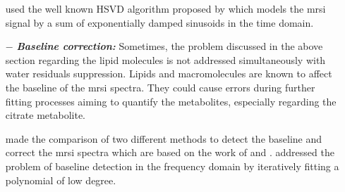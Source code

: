 \begin{enumerate}[leftmargin=*]
	\cite{Kelm2007} used the well known HSVD algorithm proposed by \cite{Pijnappel1992} which models the \ac{mrsi} signal by a sum of exponentially damped sinusoids in the time domain.%
%
%
	
\item[$-$] \textbf{\textit{Baseline correction:}} Sometimes, the problem discussed in the above section regarding the lipid molecules is not addressed simultaneously with water residuals suppression. Lipids and macromolecules are known to affect the baseline of the \ac{mrsi} spectra. They could cause errors during further fitting processes aiming to quantify the metabolites, especially regarding the citrate metabolite.
	
\cite{Parfait2012} made the comparison of two different methods to detect the baseline and correct the \ac{mrsi} spectra which are based on the work of \cite{Lieber2003} and \cite{Devos2004}. \cite{Lieber2003} addressed the problem of baseline detection in the frequency domain by iteratively fitting a polynomial of low degree.%
%
%


\end{enumerate}
